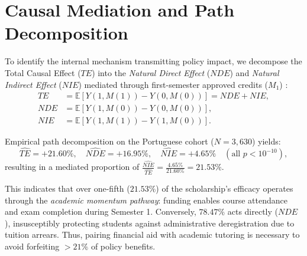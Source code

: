 \section{Causal Mediation and Path Decomposition}
\label{sec:adv_mediation}

To identify the internal mechanism transmitting policy impact, we decompose the Total Causal Effect ($TE$) into the \textit{Natural Direct Effect} ($NDE$) and \textit{Natural Indirect Effect} ($NIE$) mediated through first-semester approved credits ($M_1$) \parencite{pearl2009causality}:
\begin{align}
    TE &= \mathbb{E}\left[ Y(1, M(1)) - Y(0, M(0)) \right] = NDE + NIE, \label{eq:total_effect_decomp} \\
    NDE &= \mathbb{E}\left[ Y(1, M(0)) - Y(0, M(0)) \right], \label{eq:nde_def} \\
    NIE &= \mathbb{E}\left[ Y(1, M(1)) - Y(1, M(0)) \right]. \label{eq:nie_def}
\end{align}

Empirical path decomposition on the Portuguese cohort ($N = 3,630$) yields:
\begin{equation}
    \widehat{TE} = \mathbf{+21.60\%}, \quad \widehat{NDE} = \mathbf{+16.95\%}, \quad \widehat{NIE} = \mathbf{+4.65\%} \quad (\text{all } p < 10^{-10}),
    \label{eq:med_estimates}
\end{equation}
resulting in a mediated proportion of $\frac{\widehat{NIE}}{\widehat{TE}} = \frac{4.65\%}{21.60\%} = \mathbf{21.53\%}$.

This indicates that over one-fifth ($21.53\%$) of the scholarship's efficacy operates through the \textit{academic momentum pathway}: funding enables course attendance and exam completion during Semester 1. Conversely, $78.47\%$ acts directly ($NDE$), insusceptibly protecting students against administrative deregistration due to tuition arrears. Thus, pairing financial aid with academic tutoring is necessary to avoid forfeiting $>21\%$ of policy benefits.
